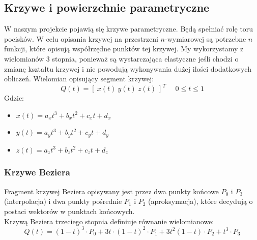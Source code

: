 \documentclass[a4paper,twoside]{article}
\begin{document}
	\subsection{Krzywe i powierzchnie parametryczne}
	W naszym projekcie pojawią się krzywe parametryczne. Będą spełniać rolę toru pocisków. W celu opisania krzywej na przestrzeni $ n $-wymiarowej są potrzebne $ n $ funkcji, które opisują współrzędne punktów tej krzywej. My wykorzystamy z wielomianów 3 stopnia, ponieważ są wystarczająca elastyczne jeśli chodzi o zmianę kształtu krzywej i nie powodują wykonywania dużej ilości dodatkowych obliczeń.
	Wielomian opisujący segment krzywej:
	$$ Q(t)=[\:x(t)\:y(t)\:z(t)\:]^T  \:\:\:\:\:\: 0 \leq t \leq 1 $$
	Gdzie:
	\begin{itemize}
		\item $ x(t)= a_x t^3+b_x t^2+c_x t+d_x $
		\item $ y(t)= a_y t^3+b_y t^2+c_y t+d_y $
		\item $ z(t)= a_z t^3+b_z t^2+c_z t+d_z $
	\end{itemize}
	
	\subsubsection{Krzywe Beziera}
	Fragment krzywej Beziera opisywany jest przez dwa punkty końcowe $ P_0 $ i $ P_3 $ (interpolacja) i dwa punkty pośrednie $ P_1 $ i $ P_2 $ (aproksymacja), które decydują o postaci wektorów w punktach końcowych.\\Krzywą Beziera trzeciego stopnia definiuje równanie wielomianowe:
	$$ Q(t)=(1-t)^3\cdot P_0+3t\cdot(1-t)^2\cdot P_1+3t^2(1-t)\cdot P_2+t^3\cdot P_3 $$
	
	
\end{document}

